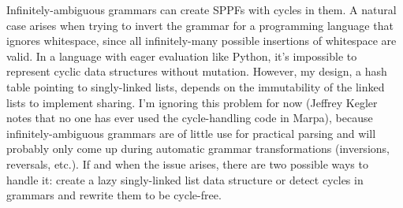 \documentclass[12pt]{article}
\begin{document}
Infinitely-ambiguous grammars can create SPPFs with cycles in them.  A
natural case arises when trying to invert the grammar for a
programming language that ignores whitespace, since all
infinitely-many possible insertions of whitespace are valid.  In a
language with eager evaluation like Python, it's impossible to
represent cyclic data structures without mutation.  However, my
design, a hash table pointing to singly-linked lists, depends on the
immutability of the linked lists to implement sharing.  I'm ignoring
this problem for now (Jeffrey Kegler notes that no one has ever used
the cycle-handling code in Marpa), because infinitely-ambiguous
grammars are of little use for practical parsing and will probably
only come up during automatic grammar transformations (inversions,
reversals, etc.).  If and when the issue arises, there are two
possible ways to handle it: create a lazy singly-linked list data
structure or detect cycles in grammars and rewrite them to be
cycle-free.
\end{document}
